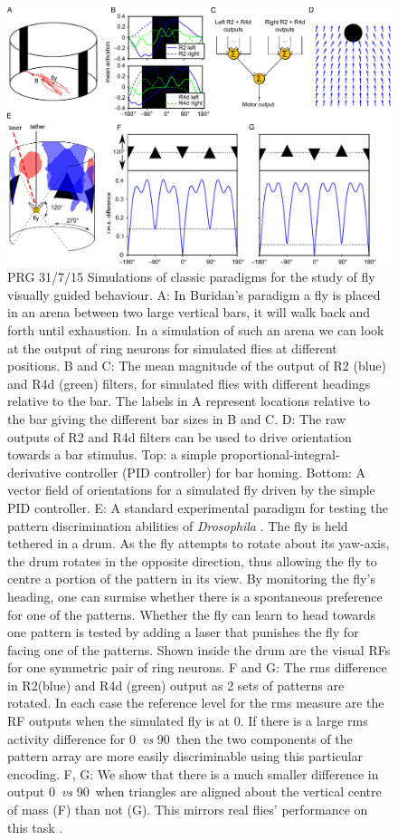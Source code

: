 \begin{figure}
\centering
\includegraphics{figures/recap}
\caption{PRG 31/7/15 Simulations of classic paradigms for the study of fly visually guided behaviour. A: In Buridan's paradigm \protect\cite{Bulthoff1982,Gotz1980} a fly is placed in an arena between two large vertical bars, it will walk back and forth until exhaustion. In a simulation of such an arena we can look at the output of ring neurons for simulated flies at different positions. B and C: The mean magnitude of the output of R2 (blue) and R4d (green) filters, for simulated flies with different headings relative to the bar. The labels in A represent locations relative to the bar giving the different bar sizes in B and C. D: The raw outputs of R2 and R4d filters can be used to drive orientation towards a bar stimulus. Top: a simple proportional-integral-derivative controller (PID controller) for bar homing. Bottom: A vector field of orientations for a simulated fly driven by the simple PID controller.
E: A standard experimental paradigm for testing the pattern discrimination abilities of \emph{Drosophila} \protect\cite{Ernst1999}. The fly is held tethered in a drum. As the fly attempts to rotate about its yaw-axis, the drum rotates in the opposite direction, thus allowing the fly to centre a portion of the pattern in its view. By monitoring the fly's heading, one can surmise whether there is a spontaneous preference for one of the patterns. Whether the fly can learn to head towards one pattern is tested by adding a laser that punishes the fly for facing one of the patterns. Shown inside the drum are the visual \acp{RF} for one symmetric pair of ring neurons.
F and G: The \ac{rms} difference in R2(blue) and R4d (green) output as 2 sets of patterns are rotated. In each case the reference level for the \ac{rms} measure are the \ac{RF} outputs when the simulated fly is at 0\degree. If there is a large \ac{rms} activity difference for 0\degree\ \emph{vs} 90\degree\ then the two components of the pattern array are more easily discriminable using this particular encoding.
F, G: We show that there is a much smaller difference in output 0\degree\ \emph{vs} 90\degree\ when triangles are aligned about the vertical centre of mass (F) than not (G).
This mirrors real flies' performance on this task \protect\cite{Ernst1999}.}
\label{fig:recap}
\end{figure}
